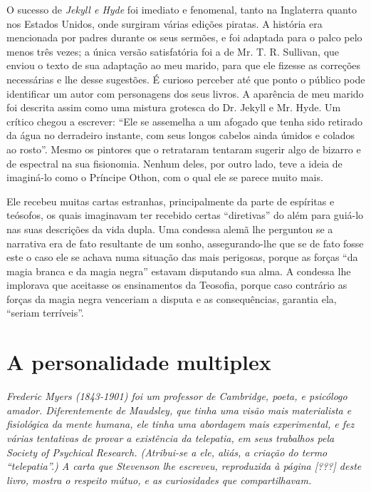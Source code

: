 O sucesso de \textit{Jekyll e Hyde} foi imediato e fenomenal, tanto na
Inglaterra quanto nos Estados Unidos, onde surgiram várias edições
piratas.  A história era mencionada por padres durante os seus sermões,
e foi adaptada para o palco pelo menos três vezes; a única versão
satisfatória foi a de Mr. T. R. Sullivan, que enviou o texto de sua
adaptação ao meu marido, para que ele fizesse as correções necessárias
e lhe desse sugestões.  É curioso perceber até que ponto o público pode
identificar um autor com personagens dos seus livros.  A aparência
de meu marido foi descrita assim como uma mistura grotesca do Dr.
Jekyll e Mr. Hyde.  Um crítico chegou a escrever: “Ele se assemelha a
um afogado que tenha sido retirado da água no derradeiro instante, com
seus longos cabelos ainda úmidos e colados ao rosto”.  Mesmo os
pintores que o retrataram tentaram sugerir algo de bizarro e de
espectral na sua fisionomia.  Nenhum deles, por outro lado, teve a
ideia de imaginá-lo como o Príncipe Othon, com o qual ele se parece
muito mais.

Ele recebeu muitas cartas estranhas, principalmente da parte de
espíritas e teósofos, os quais imaginavam ter recebido certas
“diretivas” do além para guiá-lo nas suas descrições da vida dupla. 
Uma condessa alemã lhe perguntou se a narrativa era de fato resultante
de um sonho, assegurando-lhe que se de fato fosse este o caso ele se
achava numa situação das mais perigosas, porque as forças “da magia
branca e da magia negra” estavam disputando sua alma.  A condessa lhe
implorava que aceitasse os ensinamentos da Teosofia, porque caso contrário as
forças da magia negra venceriam a disputa e as consequências, garantia
ela, “seriam terríveis”.  


\chapter[A personalidade multiplex --- Frederic Myers]{A personalidade multiplex}

\textit{Frederic Myers (1843-1901) foi um professor de Cambridge, poeta,
e psicólogo amador.  Diferentemente de Maudsley, que tinha uma visão
mais materialista e fisiológica da mente humana, ele tinha uma
abordagem mais experimental, e fez várias tentativas de provar a
existência da telepatia, em seus trabalhos pela Society of Psychical
Research. (Atribui-se a ele, aliás, a criação do termo “telepatia”.) A
carta que Stevenson lhe escreveu, reproduzida à página [???] deste			%
livro, mostra o respeito mútuo, e as curiosidades que
compartilhavam.}

